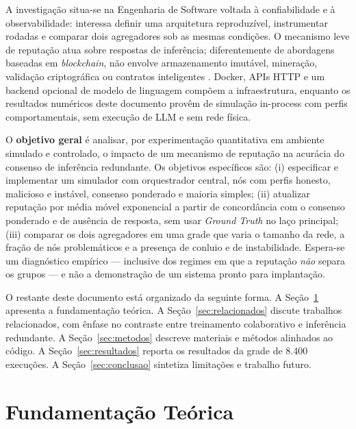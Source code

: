 \documentclass[12pt]{article}
\begin{document}
A investigação situa-se na Engenharia de Software voltada à confiabilidade e à observabilidade: interessa definir uma arquitetura reproduzível, instrumentar rodadas e comparar dois agregadores sob as mesmas condições. O mecanismo leve de reputação atua sobre respostas de inferência; diferentemente de abordagens baseadas em \textit{blockchain}, não envolve armazenamento imutável, mineração, validação criptográfica ou contratos inteligentes \cite{blockchainAI2024}. Docker, APIs HTTP e um backend opcional de modelo de linguagem compõem a infraestrutura, enquanto os resultados numéricos deste documento provêm de simulação in-process com perfis comportamentais, sem execução de LLM e sem rede física.

O \textbf{objetivo geral} é analisar, por experimentação quantitativa em ambiente simulado e controlado, o impacto de um mecanismo de reputação na acurácia do consenso de inferência redundante. Os objetivos específicos são: (i) especificar e implementar um simulador com orquestrador central, nós com perfis honesto, malicioso e instável, consenso ponderado e maioria simples; (ii) atualizar reputação por média móvel exponencial a partir de concordância com o consenso ponderado e de ausência de resposta, sem usar \textit{Ground Truth} no laço principal; (iii) comparar os dois agregadores em uma grade que varia o tamanho da rede, a fração de nós problemáticos e a presença de conluio e de instabilidade. Espera-se um diagnóstico empírico --- inclusive dos regimes em que a reputação \emph{não} separa os grupos --- e não a demonstração de um sistema pronto para implantação.

O restante deste documento está organizado da seguinte forma. A Seção~\ref{sec:fundamentacao} apresenta a fundamentação teórica. A Seção~\ref{sec:relacionados} discute trabalhos relacionados, com ênfase no contraste entre treinamento colaborativo e inferência redundante. A Seção~\ref{sec:metodos} descreve materiais e métodos alinhados ao código. A Seção~\ref{sec:resultados} reporta os resultados da grade de 8.400 execuções. A Seção~\ref{sec:conclusao} sintetiza limitações e trabalho futuro.

\section{Fundamentação Teórica}
\label{sec:fundamentacao}
\end{document}
